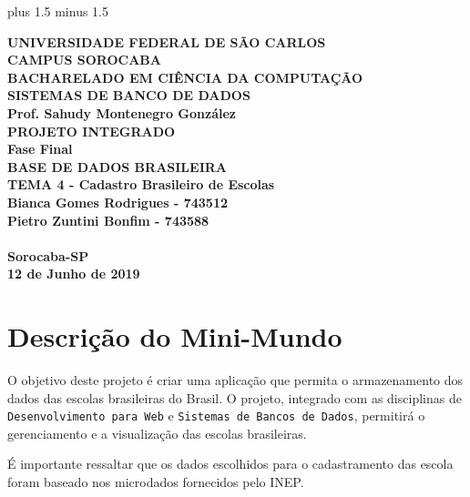 \documentclass[12pt,a4paper]{article}
\begin{document}
\font plus 1.5\font
minus 1.5\font

\begin{titlepage}

\begin{center}

\textbf{UNIVERSIDADE FEDERAL DE SÃO CARLOS\\CAMPUS SOROCABA\\\vspace{3cm} BACHARELADO EM CIÊNCIA DA COMPUTAÇÃO\\\vspace{3cm}SISTEMAS DE BANCO DE DADOS\\
Prof. Sahudy Montenegro González\\\vspace{3cm}
PROJETO INTEGRADO\\Fase Final\\\vspace{0.5cm}
BASE DE DADOS BRASILEIRA\\TEMA 4 - Cadastro Brasileiro de Escolas \\\vspace{4.0cm}
Bianca Gomes Rodrigues - 743512\\
Pietro Zuntini Bonfim - 743588\\
\\\vspace{3.5cm}
Sorocaba-SP\\12 de Junho de 2019}

\end{center}

\end{titlepage}


\pagebreak
\renewcommand*\contentsname{Índice}
\tableofcontents
\pagebreak

\section{Descrição do Mini-Mundo}

O objetivo deste projeto é criar uma aplicação que permita o armazenamento dos dados das escolas brasileiras do Brasil. O projeto, integrado com as disciplinas de \texttt{Desenvolvimento para Web} e \texttt{Sistemas de Bancos de Dados}, permitirá o gerenciamento e a visualização das escolas brasileiras.

\begin{info}
É importante ressaltar que os dados escolhidos para o cadastramento das escola foram baseado nos microdados fornecidos pelo INEP.
\end{info}
\end{document}
